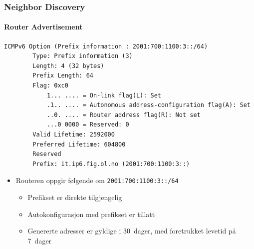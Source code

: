 \begin{frame}[fragile]
  \frametitle{Neighbor Discovery}
  \framesubtitle{Router Advertisement}
  \begin{multicols}{2}
\begin{Verbatim}[fontsize=\tiny]
    ICMPv6 Option (Prefix information : 2001:700:1100:3::/64)
        Type: Prefix information (3)
        Length: 4 (32 bytes)
        Prefix Length: 64
        Flag: 0xc0
            1... .... = On-link flag(L): Set
            .1.. .... = Autonomous address-configuration flag(A): Set
            ..0. .... = Router address flag(R): Not set
            ...0 0000 = Reserved: 0
        Valid Lifetime: 2592000
        Preferred Lifetime: 604800
        Reserved
        Prefix: it.ip6.fig.ol.no (2001:700:1100:3::)
\end{Verbatim}
  \columnbreak
  \begin{itemize}
  \item Routeren oppgir følgende om \texttt{2001:700:1100:3::/64}
    \begin{itemize}
    \item Prefikset er direkte tilgjengelig
    \item Autokonfigurasjon med prefikset er tillatt
    \item Genererte adresser er gyldige i 30~dager, med foretrukket
      levetid på 7~dager
    \end{itemize}
  \end{itemize}
  \end{multicols}
\end{frame}

